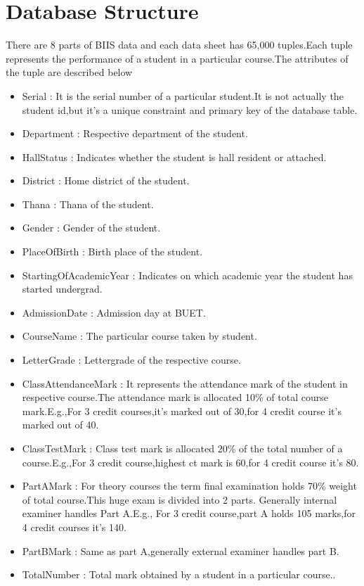 \documentclass[a4paper,12pt]{book}
\begin{document}
\section{Database Structure}
There are 8 parts of BIIS data and each data sheet has 65,000 tuples.Each tuple represents the performance of a student in a particular course.The attributes of the tuple are described below
\begin{itemize}
\item Serial : It is the serial number of a particular student.It is not actually the student id,but it's a unique constraint and primary key of the database table.
\item Department : Respective department of the student.
\item HallStatus : Indicates whether the student is hall resident or attached.
\item District : Home district of the student.
\item Thana : Thana of the student.
\item Gender : Gender of the student.
\item PlaceOfBirth : Birth place of the student.
\item StartingOfAcademicYear : Indicates on which academic year the student has started undergrad.
\item AdmissionDate : Admission day at BUET.
\item CourseName : The particular course taken by student.
\item LetterGrade : Lettergrade of the respective course. 
\item ClassAttendanceMark : It represents the attendance mark of the student in respective course.The attendance mark is allocated 10\% of total course mark.E.g.,For 3 credit courses,it's marked out of 30,for 4 credit course it's marked out of 40. 
\item ClassTestMark : Class test mark is allocated 20\% of the total number of a course.E.g.,For 3 credit course,highest ct mark is 60,for 4 credit course it's 80.
\item PartAMark :  For theory courses the term final examination holds 70\% weight of total course.This huge exam is divided into 2 parts. Generally internal examiner handles Part A.E.g., For 3 credit course,part A holds 105 marks,for 4 credit courses it's 140.
\item PartBMark : Same as part A,generally external examiner handles part B.
\item TotalNumber : Total mark obtained by a student in a particular course..

\end{itemize}
\end{document}
